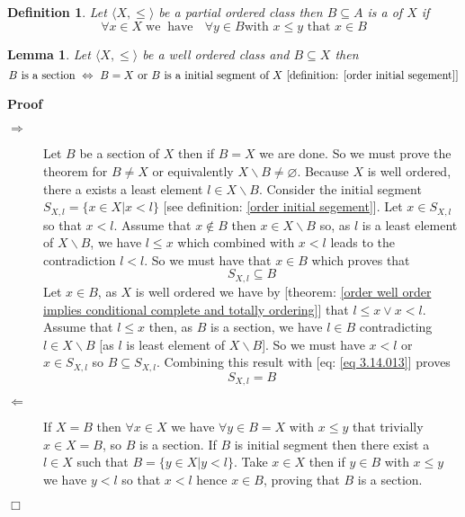 \documentclass{book}
\newcommand{\nin}{\not\in}
\newcommand{\tmop}[1]{\ensuremath{\operatorname{#1}}}
\newcommand{\tmtextbf}[1]{\text{{\bfseries{#1}}}}
\newenvironment{proof}{\noindent\textbf{Proof\ }}{\hspace*{\fill}$\Box$\medskip}
\newtheorem{definition}{Definition}
{\theorembodyfont{\rmfamily}\newtheorem{example}{Example}}
\newtheorem{lemma}{Lemma}
\begin{document}
\begin{definition}
  \label{order section}{}Let $\langle X, \leqslant \rangle$ be
  a partial ordered class then $B \subseteq A$ is a \tmtextbf{section} of $X$
  if
  \[ \forall x \in X \tmop{we} \tmop{have} \text{ } \forall y \in B \text{
     with } x \leqslant y \text{ that } x \in B \]
\end{definition}

\begin{lemma}
  \label{order section and well ordering}Let $\langle X, \leqslant \rangle$ be
  a well ordered class and $B \subseteq X$ then
  \[ B \text{ is a section } \Leftrightarrow \text{ } B = X \text{ or } B
     \text{ is a initial segment of } X \text{ [definition: \ref{order initial
     segement}]} \]
\end{lemma}

\begin{proof}
  
  \begin{description}
    \item[$\Rightarrow$] Let $B$ be a section of $X$ then if $B = X$ we are
    done. So we must prove the theorem for $B \neq X$ or equivalently
    $X\backslash B \neq \varnothing$. Because $X$ is well ordered, there a
    exists a least element $l \in X\backslash B$. Consider the initial segment
    $S_{X, l} = \{ x \in X|x < l \}$ [see definition: \ref{order initial
    segement}]. Let $x \in S_{X, l}$ so that $x < l$. Assume that $x \nin B$
    then $x \in X\backslash B$ so, as $l$ is a least element of $X\backslash
    B$, we have $l \leqslant x$ which combined with $x < l$ leads to the
    contradiction $l < l$. So we must have that $x \in B$ which proves that
    \begin{equation}
      \label{eq 3.14.013} S_{X, l} \subseteq B
    \end{equation}
    Let $x \in B$, as $X$ is well ordered we have by [theorem: \ref{order well
    order implies conditional complete and totally ordering}] that $l
    \leqslant x \vee x < l$. Assume that $l \leqslant x$ then, as $B$ is a
    section, we have $l \in B$ contradicting $l \in X\backslash B$ [as $l$ is
    least element of $X\backslash B$]. So we must have $x < l$ or $x \in S_{X,
    l}$ so $B \subseteq S_{X, l}$. Combining this result with [eq: \ref{eq
    3.14.013}] proves
    \[ S_{X, l} = B \]
    \item[$\Leftarrow$] If $X = B$ then $\forall x \in X$ we have $\forall y
    \in B = X$ with $x \leqslant y$ that trivially $x \in X = B$, so $B$ is a
    section. If $B$ is initial segment then there exist a $l \in X$ such that
    $B = \{ y \in X|y < l \}$. Take $x \in X$ then if $y \in B$ with $x
    \leqslant y$ we have $y < l$ so that $x < l$ hence $x \in B$, proving that
    $B$ is a section.
  \end{description}
\end{proof}
\end{document}
